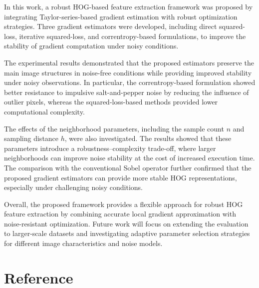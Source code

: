 \documentclass{elsarticle}
\begin{document}
In this work, a robust HOG-based feature extraction framework was proposed by
integrating Taylor-series-based gradient estimation with robust optimization
strategies. Three gradient estimators were developed, including direct
squared-loss, iterative squared-loss, and correntropy-based formulations, to
improve the stability of gradient computation under noisy conditions.

The experimental results demonstrated that the proposed estimators preserve
the main image structures in noise-free conditions while providing improved
stability under noisy observations. In particular, the correntropy-based
formulation showed better resistance to impulsive salt-and-pepper noise by
reducing the influence of outlier pixels, whereas the squared-loss-based
methods provided lower computational complexity.

The effects of the neighborhood parameters, including the sample count $n$
and sampling distance $h$, were also investigated. The results showed that
these parameters introduce a robustness--complexity trade-off, where larger
neighborhoods can improve noise stability at the cost of increased execution
time. The comparison with the conventional Sobel operator further confirmed
that the proposed gradient estimators can provide more stable HOG
representations, especially under challenging noisy conditions.

Overall, the proposed framework provides a flexible approach for robust HOG
feature extraction by combining accurate local gradient approximation with
noise-resistant optimization. Future work will focus on extending the
evaluation to larger-scale datasets and investigating adaptive parameter
selection strategies for different image characteristics and noise models.

\section*{Reference}

\end{document}
